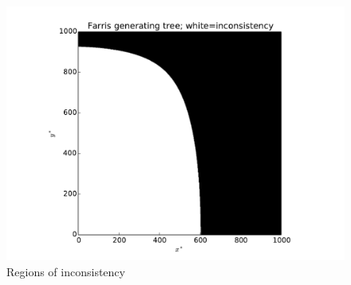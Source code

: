 \documentclass[a4paper]{article}
\begin{document}
\begin{figure}
\centering
\includegraphics[width=.9\textwidth]{ineqs-max-far-gen}
\caption{Regions of inconsistency}
\label{fig:inconsistency-farris}
\end{figure}



\end{document}
